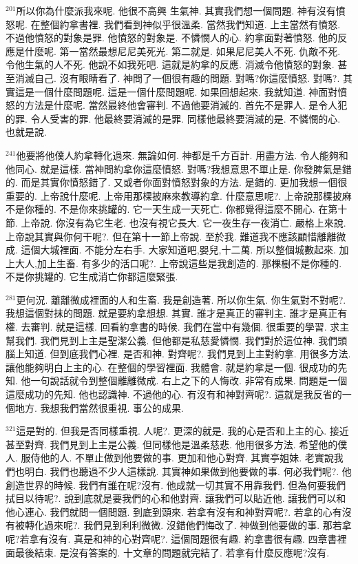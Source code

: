 \documentclass{book}
\begin{document}
$^{201}$所以你為什麼派我來呢.
他很不高興 生氣神.
其實我們想一個問題.
神有沒有憤怒呢.
在整個約拿書裡.
我們看到神似乎很溫柔.
當然我們知道.
上主當然有憤怒.
不過他憤怒的對象是罪.
他憤怒的對象是.
不憐憫人的心.
約拿面對著憤怒.
他的反應是什麼呢.
第一當然最想尼尼美死光.
第二就是.
如果尼尼美人不死.
仇敵不死.
令他生氣的人不死.
他說不如我死吧.
這就是約拿的反應.
消滅令他憤怒的對象.
甚至消滅自己.
沒有眼睛看了.
神問了一個很有趣的問題.
對嗎?你這麼憤怒.
對嗎?.
其實這是一個什麼問題呢.
這是一個什麼問題呢.
如果回想起來.
我就知道.
神面對憤怒的方法是什麼呢.
當然最終他會審判.
不過他要消滅的.
首先不是罪人.
是令人犯的罪.
令人受害的罪.
他最終要消滅的是罪.
同樣他最終要消滅的是.
不憐憫的心.
也就是說.

$^{241}$他要將他僕人約拿轉化過來.
無論如何.
神都是千方百計.
用盡方法.
令人能夠和他同心.
就是這樣.
當神問約拿你這麼憤怒.
對嗎?我想意思不單止是.
你發脾氣是錯的.
而是其實你憤怒錯了.
又或者你面對憤怒對象的方法.
是錯的.
更加我想一個很重要的.
上帝說什麼呢.
上帝用那棵披麻來教導約拿.
什麼意思呢?.
上帝說那棵披麻不是你種的.
不是你來挑罐的.
它一天生成一天死亡.
你都覺得這麼不開心.
在第十節.
上帝說.
你沒有為它生老.
也沒有視它長大.
它一夜生存一夜消亡.
嚴格上來說.
上帝說其實與你何干呢?.
但在第十一節上帝說.
至於我.
難道我不應該顧惜離離微成.
這個大城裡面.
不能分左右手.
大家知道吧,嬰兒,十二萬.
所以整個城數起來.
加上大人,加上生畜.
有多少的活口呢?.
上帝說這些是我創造的.
那棵樹不是你種的.
不是你挑罐的.
它生成消亡你都這麼緊張.

$^{281}$更何況.
離離微成裡面的人和生畜.
我是創造著.
所以你生氣.
你生氣對不對呢?.
我想這個對抹的問題.
就是要約拿想想.
其實.
誰才是真正的審判主.
誰才是真正有權.
去審判.
就是這樣.
回看約拿書的時候.
我們在當中有幾個.
很重要的學習.
求主幫我們.
我們見到上主是聖潔公義.
但他都是私慈愛憐憫.
我們對於這位神.
我們頭腦上知道.
但到底我們心裡.
是否和神.
對齊呢?.
我們見到上主對約拿.
用很多方法.
讓他能夠明白上主的心.
在整個的學習裡面.
我體會.
就是約拿是一個.
很成功的先知.
他一句說話就令到整個離離微成.
右上之下的人悔改.
非常有成果.
問題是一個這麼成功的先知.
他也認識神.
不過他的心.
有沒有和神對齊呢?.
這就是我反省的一個地方.
我想我們當然很重視.
事公的成果.

$^{321}$這是對的.
但我是否同樣重視.
人呢?.
更深的就是.
我的心是否和上主的心.
接近甚至對齊.
我們見到上主是公義.
但同樣他是溫柔慈悲.
他用很多方法.
希望他的僕人.
服侍他的人.
不單止做到他要做的事.
更加和他心對齊.
其實亭姐妹.
老實說我們也明白.
我們也聽過不少人這樣說.
其實神如果做到他要做的事.
何必我們呢?.
他創造世界的時候.
我們有誰在呢?沒有.
他成就一切其實不用靠我們.
但為何要我們拭目以待呢?.
說到底就是要我們的心和他對齊.
讓我們可以貼近他.
讓我們可以和他心連心.
我們就問一個問題.
到底到頭來.
若拿有沒有和神對齊呢?.
若拿的心有沒有被轉化過來呢?.
我們見到利利微微.
沒錯他們悔改了.
神做到他要做的事.
那若拿呢?若拿有沒有.
真是和神的心對齊呢?.
這個問題很有趣.
約拿書很有趣.
四章書裡面最後結束.
是沒有答案的.
十文章的問題就完結了.
若拿有什麼反應呢?沒有.
\end{document}
